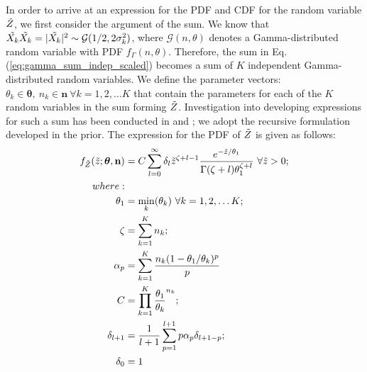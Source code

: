 In order to arrive at an expression for the PDF and CDF for the random variable $\Tilde{Z}$, we first consider the argument of the sum. We know that $\Tilde{X_k}\Tilde{X_k} = \vert \Tilde{X_k}\vert^2\sim\mathcal{G}(1/2, 2\sigma_k^2)$, where $\mathcal{G}(n,\theta)$ denotes a Gamma-distributed random variable with PDF $f_\Gamma(n,\theta)$. Therefore, the sum in Eq. (\ref{eq:gamma_sum_indep_scaled}) becomes a sum of $K$ independent Gamma-distributed random variables. We define the parameter vectors: $\theta_k \in \boldsymbol{\theta},\ n_k \in \textbf{n} \ \forall k = 1,2,\ldots K$ that contain the parameters for each of the $K$ random variables in the sum forming $\Tilde{Z}$. Investigation into developing expressions for such a sum has been conducted in \cite{Moschopoulos1985} and \cite{Mathai1982}; we adopt the recursive formulation developed in the prior. The expression for the PDF of $\Tilde{Z}$ is given as follows:\\
\begin{equation}\label{eq:gamma_sum_indep_scaled_pdf}
    \begin{aligned}
        f_{\Tilde{Z}}(\Tilde{z};\boldsymbol{\theta},\textbf{n}) &= C\sum_{l = 0}^\infty \delta_l \Tilde{z}^{\zeta+l-1}\frac{e^{-\Tilde{z}/\theta_1}}{\Gamma(\zeta+l)\theta_1^{\zeta+l}} \ \forall \Tilde{z} > 0; \\
        where:\\
        \theta_1 &= \min_k(\theta_k) \ \forall k=1,2,\ldots K;\\
        \zeta &= \sum_{k = 1}^K n_k;\\
        \alpha_p &= \sum_{k = 1}^K \frac{n_k(1-\theta_1/\theta_k)^p}{p}\\
        C &= \prod_{k = 1}^K \frac{\theta_1}{\theta_k}^{n_k};\\
        \delta_{l+1} &= \frac{1}{l+1}\sum_{p = 1}^{l+1} p\alpha_p\delta_{l+1-p};\\
        \delta_0 &= 1
    \end{aligned}
\end{equation}